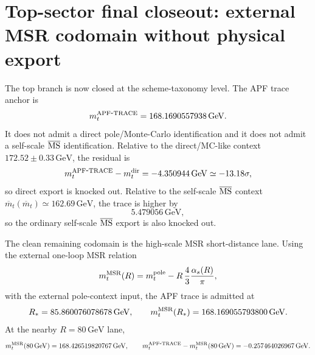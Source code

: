 
\section{Top-sector final closeout: external MSR codomain without physical export}
\label{sec:top-final-closeout}

The top branch is now closed at the scheme-taxonomy level. The APF trace anchor is
\begin{equation}
  m_t^{\rm APF\mbox{-}TRACE}=168.1690557938\,\mathrm{GeV}.
\end{equation}
It does not admit a direct pole/Monte-Carlo identification and it does not admit a self-scale
\(\overline{\rm MS}\) identification. Relative to the direct/MC-like context
\(172.52\pm0.33\,\mathrm{GeV}\), the residual is
\begin{equation}
  m_t^{\rm APF\mbox{-}TRACE}-m_t^{\rm dir}=-4.350944\,\mathrm{GeV}
  \simeq -13.18\sigma,
\end{equation}
so direct export is knocked out. Relative to the self-scale \(\overline{\rm MS}\) context
\(\overline m_t(\overline m_t)\simeq 162.69\,\mathrm{GeV}\), the trace is higher by
\begin{equation}
  5.479056\,\mathrm{GeV},
\end{equation}
so the ordinary self-scale \(\overline{\rm MS}\) export is also knocked out.

The clean remaining codomain is the high-scale MSR short-distance lane. Using the external one-loop MSR relation
\begin{equation}
  m_t^{\rm MSR}(R)=m_t^{\rm pole}-R\,{4\over3}{\alpha_s(R)\over\pi},
\end{equation}
with the external pole-context input, the APF trace is admitted at
\begin{equation}
  R_*=85.860076078678\,\mathrm{GeV},\qquad
  m_t^{\rm MSR}(R_*)=168.169055793800\,\mathrm{GeV}.
\end{equation}
At the nearby \(R=80\,\mathrm{GeV}\) lane,
\begin{equation}
  m_t^{\rm MSR}(80\,\mathrm{GeV})=168.426519820767\,\mathrm{GeV},
  \qquad
  m_t^{\rm APF\mbox{-}TRACE}-m_t^{\rm MSR}(80\,\mathrm{GeV})=-0.257464026967\,\mathrm{GeV}.
\end{equation}

